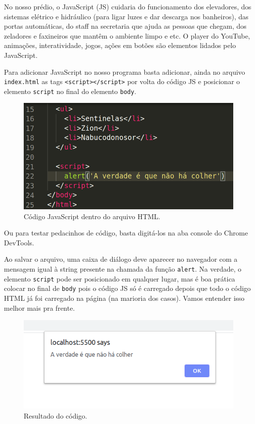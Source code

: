 
No nosso prédio, o JavaScript (JS) cuidaria do funcionamento dos elevadores, 
dos sistemas elétrico e hidráulico (para ligar luzes e dar descarga nos banheiros), das
portas automáticas, do staff na secretaria que ajuda as pessoas que
chegam, dos zeladores e faxineiros que mantêm o ambiente limpo e etc.
O player do YouTube, animações, interatividade, jogos, ações em botões são elementos
lidados pelo JavaScript. 

Para adicionar JavaScript no nosso programa basta adicionar, ainda no
arquivo \texttt{index.html} as tags
\texttt{\textless{}script\textgreater{}\textless{}/script\textgreater{}}
por volta do código JS e posicionar o elemento \texttt{script} no final
do elemento \texttt{body}.

\begin{figure}[h!]
    \centering
    \includegraphics[scale=.5]{imgs/alert-code.png}
    \caption{Código JavaScript dentro do arquivo HTML.}
    \label{fig:alert-code}
\end{figure}



Ou para testar pedacinhos de código, basta digitá-los na aba console do Chrome DevTools.


Ao salvar o arquivo, uma caixa de diálogo deve aparecer no navegador com
a mensagem igual à string presente na chamada da função \texttt{alert}.
Na verdade, o elemento \texttt{script} pode ser posicionado em qualquer
lugar, mas é boa prática colocar no final de \texttt{body} pois o código
JS só é carregado depois que todo o código HTML já foi carregado na
página (na marioria dos casos). Vamos entender isso melhor mais pra frente.


\begin{figure}[h!]
    \centering
    \includegraphics[scale=.5]{imgs/alert-page.png}
    \caption{Resultado do código.}
    \label{fig:alert-page}
\end{figure}


